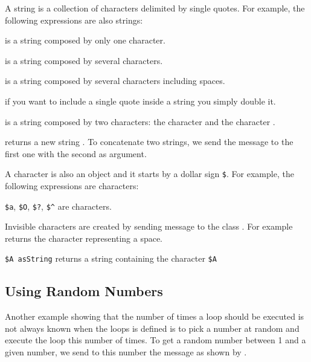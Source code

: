\begin{sqref}
A string  is a collection of characters  delimited by single quotes. For example, 
the following expressions are also strings: 
\begin{description}
\item{} is a string composed by only one character. 
\item{} is a string  composed by several characters.
\item{} is a string  composed by several characters including spaces. 
\item{} if you want to include a single quote inside a string you simply double it. 
\item{} is a string composed by two characters: the character  and the character  .
\item{ returns a new string }. To concatenate two strings, we send the message \ct{,}\index{,} to the first one with the second as argument. 
\end{description}

A character is also an object and it starts by a dollar sign \texttt{\$}.
For example,  the following expressions are characters: 
\begin{description}
\item{\texttt{\$a}, \texttt{\$O}, \texttt{\$?}, \texttt{\$\^}} are characters.
\item Invisible characters are created by sending message to the class . For example  returns the character representing a space. 
\item \texttt{\$A asString} returns  a string containing the character  \texttt{\$A}
\end{description}
\end{sqref}

\subsection*{Using Random Numbers}
Another example showing that the number of times a loop should be executed is not always known when the loops is defined is  to pick a number at random and execute the loop this number of times. To get a random number between 1 and a given number, we send to this number the message  as shown by . 

